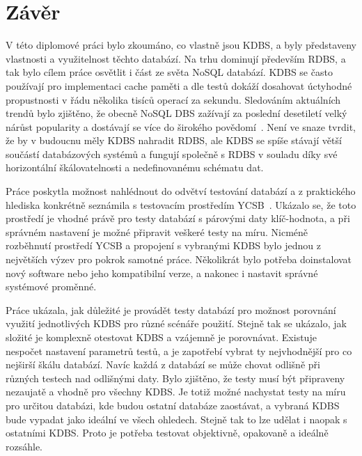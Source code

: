 \documentclass[czech,master,dept460,male,csharp,cpdeclaration]{diploma}
\begin{document}
	\chapter{Závěr\label{chapter:5-diploma_results}}
	
	V této diplomové práci bylo zkoumáno, co vlastně jsou KDBS, a byly představeny vlastnosti a využitelnost těchto databází. Na trhu dominují především RDBS, a tak bylo cílem práce osvětlit i část ze světa NoSQL databází. KDBS se často používají pro implementaci cache paměti a dle testů dokáží dosahovat úctyhodné propustnosti v řádu několika tisíců operací za sekundu. Sledováním aktuálních trendů bylo zjištěno, že obecně NoSQL DBS zažívají za poslední desetiletí velký nárůst popularity a dostávají se více do širokého povědomí~\cite{dbranking-trend-by-model}. Není ve snaze tvrdit, že by v budoucnu měly KDBS nahradit RDBS, ale KDBS se spíše stávají větší součástí databázových systémů a fungují společně s RDBS v souladu díky své horizontální škálovatelnosti a nedefinovanému schématu dat.
	
	Práce poskytla možnost nahlédnout do odvětví testování databází a z praktického hlediska konkrétně seznámila s testovacím prostředím YCSB~\cite{ycsb}. Ukázalo se, že toto prostředí je vhodné právě pro testy databází s párovými daty klíč-hodnota, a při správném nastavení je možné připravit veškeré testy na míru. Nicméně rozběhnutí prostředí YCSB a propojení s vybranými KDBS bylo jednou z největších výzev pro pokrok samotné práce. Několikrát bylo potřeba doinstalovat nový software nebo jeho kompatibilní verze, a nakonec i nastavit správné systémové proměnné.
	
	Práce ukázala, jak důležité je provádět testy databází pro možnost porovnání využití jednotlivých KDBS pro různé scénáře použití. Stejně tak se ukázalo, jak složité je komplexně otestovat KDBS a vzájemně je porovnávat. Existuje nespočet nastavení parametrů testů, a je zapotřebí vybrat ty nejvhodnější pro co nejširší škálu databází. Navíc každá z databází se může chovat odlišně při různých testech nad odlišnými daty. Bylo zjištěno, že testy musí být připraveny nezaujatě a vhodně pro všechny KDBS. Je totiž možné nachystat testy na míru pro určitou databázi, kde budou ostatní databáze zaostávat, a vybraná KDBS bude vypadat jako ideální ve všech ohledech. Stejně tak to lze udělat i naopak s ostatními KDBS. Proto je potřeba testovat objektivně, opakovaně a ideálně rozsáhle.
	
\end{document}
